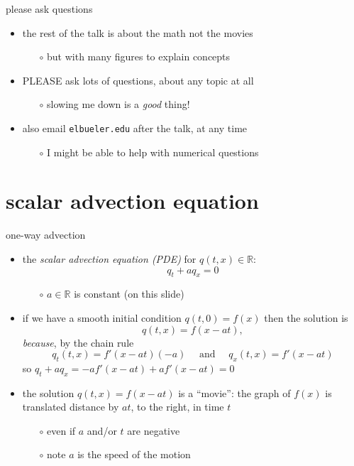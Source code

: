 \documentclass[10pt,hyperref,dvipsnames]{beamer}
\newcommand{\RR}{\mathbb{R}}
\begin{document}
\begin{frame}{please ask questions}

\begin{itemize}
\item the rest of the talk is about the math not the movies
    \begin{itemize}
    \item[$\circ$] but with many figures to explain concepts
    \end{itemize}
\item \alert{PLEASE} ask lots of questions, about any topic at all
    \begin{itemize}
    \item[$\circ$] slowing me down is a \emph{good} thing!
    \end{itemize}
\item also email \quad \texttt{elbueler\@@alaska.edu} \quad after the talk, at any time
    \begin{itemize}
    \item[$\circ$] I might be able to help with numerical questions
    \end{itemize}
\end{itemize}
\end{frame}



\section{scalar advection equation}

\begin{frame}{one-way advection}

\begin{itemize}
\item the \emph{scalar advection equation (PDE)} for $q(t,x) \in \RR$:
    $$q_t + a q_x=0$$

    \begin{itemize}
    \item[$\circ$] $a\in\RR$ is constant (on this slide)
    \end{itemize}
\item if we have a smooth initial condition $q(t,0)=f(x)$ then the solution is
    $$q(t,x) = f(x-at),$$
\emph{because}, by the chain rule
    $$q_t(t,x) = f'(x-at) (-a) \quad \text{ and } \quad q_x(t,x) = f'(x-at)$$
so $q_t + a q_x = -a f'(x-at) + a f'(x-at) = 0$
\item the solution $q(t,x)=f(x-at)$ is a ``movie'': the graph of $f(x)$ is translated distance by $at$, to the right, in time $t$
    \begin{itemize}
    \item[$\circ$] even if $a$ and/or $t$ are negative
    \item[$\circ$] note $a$ is the speed of the motion
    \end{itemize}
\end{itemize}
\end{frame}
\end{document}
